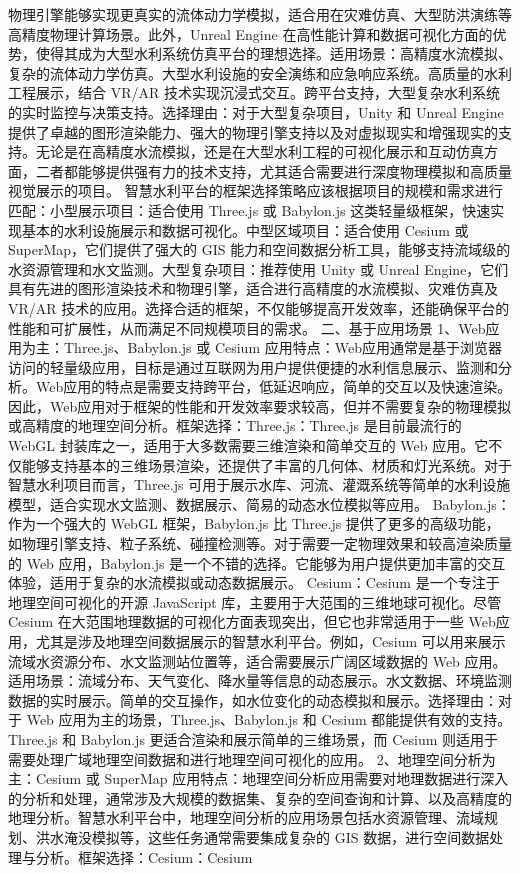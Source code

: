 物理引擎能够实现更真实的流体动力学模拟，适合用在灾难仿真、大型防洪演练等高精度物理计算场景。此外，Unreal Engine 在高性能计算和数据可视化方面的优势，使得其成为大型水利系统仿真平台的理想选择。适用场景：高精度水流模拟、复杂的流体动力学仿真。大型水利设施的安全演练和应急响应系统。高质量的水利工程展示，结合 VR/AR 技术实现沉浸式交互。跨平台支持，大型复杂水利系统的实时监控与决策支持。选择理由：对于大型复杂项目，Unity 和 Unreal Engine 提供了卓越的图形渲染能力、强大的物理引擎支持以及对虚拟现实和增强现实的支持。无论是在高精度水流模拟，还是在大型水利工程的可视化展示和互动仿真方面，二者都能够提供强有力的技术支持，尤其适合需要进行深度物理模拟和高质量视觉展示的项目。 智慧水利平台的框架选择策略应该根据项目的规模和需求进行匹配：小型展示项目：适合使用 Three.js 或 Babylon.js 这类轻量级框架，快速实现基本的水利设施展示和数据可视化。中型区域项目：适合使用 Cesium 或 SuperMap，它们提供了强大的 GIS 能力和空间数据分析工具，能够支持流域级的水资源管理和水文监测。大型复杂项目：推荐使用 Unity 或 Unreal Engine，它们具有先进的图形渲染技术和物理引擎，适合进行高精度的水流模拟、灾难仿真及 VR/AR 技术的应用。选择合适的框架，不仅能够提高开发效率，还能确保平台的性能和可扩展性，从而满足不同规模项目的需求。 二、基于应用场景 1、Web应用为主：Three.js、Babylon.js 或 Cesium 应用特点：Web应用通常是基于浏览器访问的轻量级应用，目标是通过互联网为用户提供便捷的水利信息展示、监测和分析。Web应用的特点是需要支持跨平台，低延迟响应，简单的交互以及快速渲染。因此，Web应用对于框架的性能和开发效率要求较高，但并不需要复杂的物理模拟或高精度的地理空间分析。框架选择：Three.js：Three.js 是目前最流行的 WebGL 封装库之一，适用于大多数需要三维渲染和简单交互的 Web 应用。它不仅能够支持基本的三维场景渲染，还提供了丰富的几何体、材质和灯光系统。对于智慧水利项目而言，Three.js 可用于展示水库、河流、灌溉系统等简单的水利设施模型，适合实现水文监测、数据展示、简易的动态水位模拟等应用。 Babylon.js：作为一个强大的 WebGL 框架，Babylon.js 比 Three.js 提供了更多的高级功能，如物理引擎支持、粒子系统、碰撞检测等。对于需要一定物理效果和较高渲染质量的 Web 应用，Babylon.js 是一个不错的选择。它能够为用户提供更加丰富的交互体验，适用于复杂的水流模拟或动态数据展示。 Cesium：Cesium 是一个专注于地理空间可视化的开源 JavaScript 库，主要用于大范围的三维地球可视化。尽管 Cesium 在大范围地理数据的可视化方面表现突出，但它也非常适用于一些 Web应用，尤其是涉及地理空间数据展示的智慧水利平台。例如，Cesium 可以用来展示流域水资源分布、水文监测站位置等，适合需要展示广阔区域数据的 Web 应用。适用场景：流域分布、天气变化、降水量等信息的动态展示。水文数据、环境监测数据的实时展示。简单的交互操作，如水位变化的动态模拟和展示。选择理由：对于 Web 应用为主的场景，Three.js、Babylon.js 和 Cesium 都能提供有效的支持。Three.js 和 Babylon.js 更适合渲染和展示简单的三维场景，而 Cesium 则适用于需要处理广域地理空间数据和进行地理空间可视化的应用。 2、地理空间分析为主：Cesium 或 SuperMap 应用特点：地理空间分析应用需要对地理数据进行深入的分析和处理，通常涉及大规模的数据集、复杂的空间查询和计算、以及高精度的地理分析。智慧水利平台中，地理空间分析的应用场景包括水资源管理、流域规划、洪水淹没模拟等，这些任务通常需要集成复杂的 GIS 数据，进行空间数据处理与分析。框架选择：Cesium：Cesium 